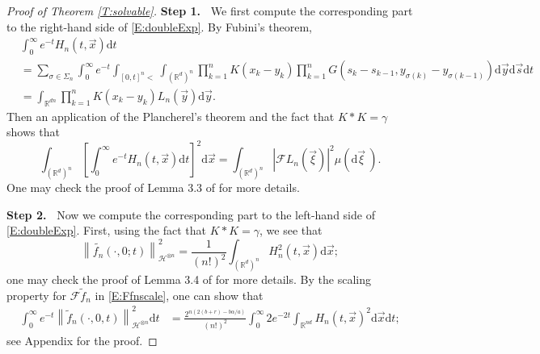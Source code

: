 \documentclass[a4paper,11pt]{article}
\numberwithin{equation}{section}
\numberwithin{equation}{section}
\theoremstyle{plain}
\theoremstyle{definition}
\newcommand{\ud}{\ensuremath{\mathrm{d} }}
\newcommand{\Norm}[1]{\left\|  #1   \right\|}
\newcommand{\R}{\mathbb{R}}
\begin{document}
\begin{proof}[Proof of Theorem \ref{T:solvable}]
  {\bigskip\bf\noindent Step 1.~}%
  We first compute the corresponding part to the right-hand side of \eqref{E:doubleExp}. By Fubini's
  theorem,
  \begin{align*}
      & \int_0^\infty e^{-t} H_n(t,\vec{x}) \ud t                                                                                                                                                                   \\
      & = \sum_{\sigma \in \Sigma_n} \int_0^\infty e^{-t} \int_{[0,t]^n <} \int_{(\R^d)^n} \prod_{k=1}^n K(x_k-y_k)   \prod_{k=1}^n G(s_k - s_{k-1}, y_{\sigma(k)} - y_{\sigma(k-1)}) \ud \vec{y} \ud \vec{s} \ud t \\
      & = \int_{\R^{dn}} \prod_{k=1}^n K(x_k-y_k) L_n\left(\vec{y}\right) \ud \vec{y}.
  \end{align*}
  Then an application of the Plancherel's theorem and the fact that $K*K=\gamma$ shows that
  \begin{equation} \label{E:Hneq1}
    \int_{(\R^d)^n} \left[ \int_0^\infty e^{-t} H_n(t,\vec{x}) \ud t \right]^2 \ud \vec{x}
    = \int_{(\R^d)^n} | \mathcal{F}L_n(\vec{\xi}) |^2 \mu(\ud \vec{\xi}\:).
  \end{equation}
  One may check the proof of Lemma 3.3 of \cite{BCC21} for more details.%

  {\bigskip\bf\noindent Step 2.~}%
  Now we compute the corresponding part to the left-hand side of
  \eqref{E:doubleExp}.  First, using the fact that $K*K=\gamma$, we see that
  \begin{equation} \label{E:inteq1}
    \Norm{\widetilde{f_n}(\cdot,0;t)}_{\mathcal{H}^{\otimes n}}^2 = \frac{1}{(n!)^2}\int_{(\R^d)^n} H_n^2(t,\vec{x}) \ud \vec{x};
  \end{equation}
  one may check the proof of Lemma 3.4 of \cite{BCC21} for more details.  By the scaling property
  for $\mathcal{F}\widetilde{f}_n$ in \eqref{E:Ffnscale}, one can show that
  \begin{align} \label{E:fHn}
    \int_0^\infty e^{-t} \Norm{ \widetilde{f}_n(\cdot,0,t) }_{\mathcal{H}^{\otimes n}}^2 \ud t
     & = \frac{2^{n(2(b+r) - b\alpha/a)}}{(n!)^2}  \int_0^\infty 2e^{-2t} \int_{\R^{nd}} H_n(t,\vec{x})^2 \ud \vec{x} \ud t;
  \end{align}
  see Appendix for the proof.%


\end{proof}
\end{document}
